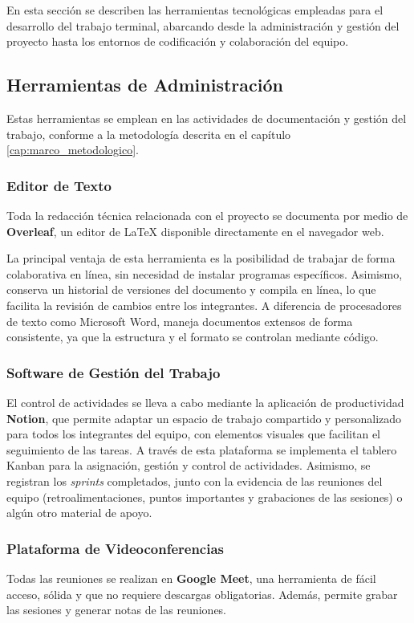 En esta sección se describen las herramientas tecnológicas empleadas para el desarrollo del trabajo terminal, abarcando desde la administración y gestión del proyecto hasta los entornos de codificación y colaboración del equipo.

\subsection{Herramientas de Administración}

Estas herramientas se emplean en las actividades de documentación y gestión del trabajo, conforme a la metodología descrita en el capítulo \ref{cap:marco_metodologico}.

\subsubsection{Editor de Texto}
Toda la redacción técnica relacionada con el proyecto se documenta por medio de \textbf{Overleaf}, un editor de LaTeX disponible directamente en el navegador web.

La principal ventaja de esta herramienta es la posibilidad de trabajar de forma colaborativa en línea, sin necesidad de instalar programas específicos. Asimismo, conserva un historial de versiones del documento y compila en línea, lo que facilita la revisión de cambios entre los integrantes. A diferencia de procesadores de texto como Microsoft Word, maneja documentos extensos de forma consistente, ya que la estructura y el formato se controlan mediante código.

\subsubsection{Software de Gestión del Trabajo}
El control de actividades se lleva a cabo mediante la aplicación de productividad \textbf{Notion}, que permite adaptar un espacio de trabajo compartido y personalizado para todos los integrantes del equipo, con elementos visuales que facilitan el seguimiento de las tareas. A través de esta plataforma se implementa el tablero Kanban para la asignación, gestión y control de actividades. Asimismo, se registran los \textit{sprints} completados, junto con la evidencia de las reuniones del equipo (retroalimentaciones, puntos importantes y grabaciones de las sesiones) o algún otro material de apoyo.

\subsubsection{Plataforma de Videoconferencias}
Todas las reuniones se realizan en \textbf{Google Meet}, una herramienta de fácil acceso, sólida y que no requiere descargas obligatorias. Además, permite grabar las sesiones y generar notas de las reuniones.

